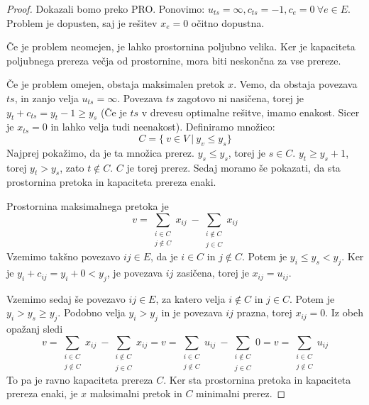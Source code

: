 \documentclass[11pt, a4paper]{article}
\begin{document}
    \begin{proof}
        Dokazali bomo preko PRO. Ponovimo: \(u_{ts}=\infty, c_{ts}=-1, c_e=0\ \forall e \in E\). Problem je dopusten, saj je rešitev \(x_e=0\) očitno dopustna.
        \par
        Če je problem neomejen, je lahko prostornina poljubno velika. Ker je kapaciteta poljubnega prereza večja od prostornine, mora biti neskončna za vse prereze.
        \par
        Če je problem omejen, obstaja maksimalen pretok \(x\). Vemo, da obstaja povezava \(ts\), in zanjo velja \(u_{ts}=\infty\). Povezava \(ts\) zagotovo ni nasičena, torej je \(y_t + c_{ts} = y_t - 1 \ge y_s\) (Če je \(ts\) v drevesu optimalne rešitve, imamo enakost. Sicer je \(x_{ts}=0\) in lahko velja tudi neenakost). Definiramo množico:
        \[C = \{\ v \in V\ |\ y_v \le y_s \}\]
        Najprej pokažimo, da je ta množica prerez. \(y_s \le y_s\), torej je \(s \in C\). \(y_t \ge y_s + 1\), torej \(y_t > y_s\), zato \(t \notin C\). \(C\) je torej prerez. Sedaj moramo še pokazati, da sta prostornina pretoka in kapaciteta prereza enaki.
        \par
        Prostornina maksimalnega pretoka je
        \[
            v = \sum_{\substack{i \in C \\ j \notin C}} x_{ij}\ - \sum_{\substack{i \notin C \\ j \in C}} x_{ij} 
        \]
        Vzemimo takšno povezavo \(ij \in E\), da je \(i \in C\) in \(j \notin C\). Potem je \(y_i \le y_s < y_j\). Ker je \(y_i + c_{ij} = y_i + 0 < y_j\), je povezava \(ij\) zasičena, torej je \(x_{ij} = u_{ij}\).
        \par
        Vzemimo sedaj še povezavo \(ij \in E\), za katero velja \(i \notin C\) in \(j \in C\). Potem je \(y_i > y_s \ge y_j\). Podobno velja \(y_i > y_j\) in je povezava \(ij\) prazna, torej \(x_{ij} = 0\). Iz obeh opažanj sledi
        \[
            v = \sum_{\substack{i \in C \\ j \notin C}} x_{ij}\ - \sum_{\substack{i \notin C \\ j \in C}} x_{ij} = v = \sum_{\substack{i \in C \\ j \notin C}} u_{ij}\ - \sum_{\substack{i \notin C \\ j \in C}} 0 = v = \sum_{\substack{i \in C \\ j \notin C}} u_{ij}
        \]
        To pa je ravno kapaciteta prereza \(C\). Ker sta prostornina pretoka in kapaciteta prereza enaki, je \(x\) maksimalni pretok in \(C\) minimalni prerez. 
    \end{proof}
\end{document}
